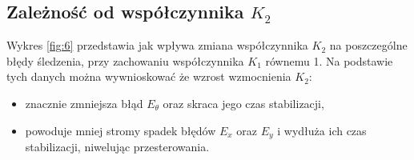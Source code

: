 \documentclass[12pt,a4paper]{article}
\begin{document}
  \subsection{Zależność od współczynnika $K_2$}
  Wykres \ref{fig:6} przedstawia jak wpływa zmiana współczynnika $K_2$ na poszczególne błędy śledzenia, przy zachowaniu współczynnika $K_1$ równemu 1. Na podstawie tych danych można wywnioskować że wzrost wzmocnienia $K_2$:

  \begin{itemize}
    \item znacznie zmniejsza błąd $E_\theta$ oraz skraca jego czas stabilizacji,
    \item powoduje mniej stromy spadek błędów $E_x$ oraz $E_y$ i wydłuża ich czas stabilizacji, niwelując przesterowania.
  \end{itemize}
  
\end{document}
